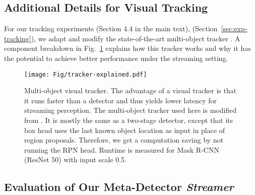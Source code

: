 \subsection{Additional Details for Visual Tracking}
\label{app:tracking}

For our tracking experiments
\ifstandalonesupplement
    (Section 4.4 in the main text),
\else
    (Section~\ref{sec:exp-tracking}),
\fi
we adapt and modify the state-of-the-art multi-object tracker \cite{Bergmann2019TrackingWB}. A component breakdown in Fig.~\ref{fig:tracker} explains how this tracker works and why it has the potential to achieve better performance under the streaming setting.

\begin{figure}[!h]
\centering
\texttt{[image: Fig/tracker-explained.pdf]}
\vspace{-0.5em}
\caption{Multi-object visual tracker. The advantage of a visual tracker is that it runs faster than a detector and thus yields lower latency for streaming perception. The multi-object tracker used here is modified from \cite{Bergmann2019TrackingWB}. It is mostly the same as a two-stage detector, except that its box head uses the last known object location as input in place of region proposals. Therefore, we get a computation saving by not running the RPN head. Runtime is measured for Mask R-CNN (ResNet 50) with input scale 0.5.}
\label{fig:tracker}
\vspace{-1em}
\end{figure}

\subsection{Evaluation of Our Meta-Detector {\em Streamer}}
\label{app:metaalg}

